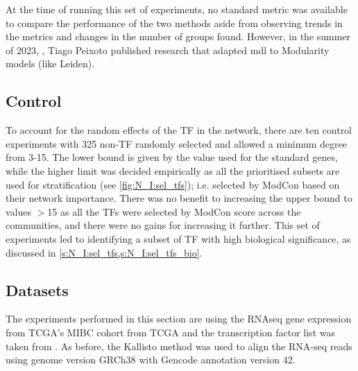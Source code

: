 At the time of running this set of experiments, no standard metric was available to compare the performance of the two methods aside from observing trends in the metrics and changes in the number of groups found. However, in the summer of 2023, \cite{Peixoto2023-mw}, Tiago Peixoto published research that adapted \acrshort{mdl} to Modularity models (like Leiden).

\subsection*{Control}

To account for the random effects of the TF in the network, there are ten control experiments with 325 non-TF randomly selected and allowed a minimum degree from 3-15. The lower bound is given by the value used for the standard genes, while the higher limit was decided empirically as all the prioritised subsets are used for stratification (see \cref{fig:N_I:sel_tfs}); i.e. selected by ModCon based on their network importance. There was no benefit to increasing the upper bound to values $>$15 as all the TFs were selected by ModCon score across the communities, and there were no gains for increasing it further. This set of experiments led to identifying a subset of TF with high biological significance, as discussed in \cref{s:N_I:sel_tfs,s:N_I:sel_tfs_bio}.



\subsection* {Datasets}

The experiments performed in this section are using the RNAseq gene expression from TCGA's MIBC cohort from TCGA and the transcription factor list was taken from \citet{Lambert2018-el}. As before, the Kallisto method was used to align the RNA-seq reads using genome version GRCh38 with Gencode annotation version 42. 
